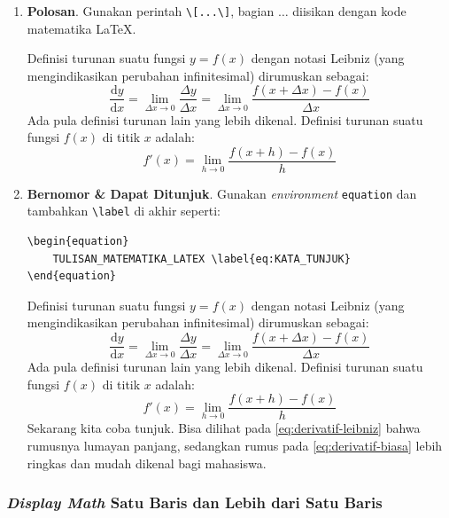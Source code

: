 \begin{enumerate}[label=\alph*.]
    \item \textbf{Polosan}. Gunakan perintah \verb|\[...\]|, bagian $\dots$ diisikan dengan kode matematika \LaTeX.
    
    Definisi turunan suatu fungsi $y = f(x)$ dengan notasi Leibniz (yang mengindikasikan perubahan infinitesimal) dirumuskan sebagai:
    \[\frac{\mathrm{d}y}{\mathrm{d}x} = \lim_{\Delta x \to 0} \frac{\Delta y}{\Delta x} = \lim_{\Delta x \to 0} \frac{f(x + \Delta x) - f(x)}{\Delta x}\]
    Ada pula definisi turunan lain yang lebih dikenal. Definisi turunan suatu fungsi $f(x)$ di titik $x$ adalah:
    \[f'(x) = \lim_{h \to 0} \frac{f(x+h) - f(x)}{h}\]
    
    \item \textbf{Bernomor \& Dapat Ditunjuk}. Gunakan \textit{environment} \texttt{equation} dan tambahkan \verb|\label| di akhir seperti:
    
    \begin{lstlisting}
\begin{equation}
    TULISAN_MATEMATIKA_LATEX \label{eq:KATA_TUNJUK}
\end{equation}    
    \end{lstlisting}
    
    Definisi turunan suatu fungsi $y = f(x)$ dengan notasi Leibniz (yang mengindikasikan perubahan infinitesimal) dirumuskan sebagai:
    \begin{equation}
        \frac{\mathrm{d}y}{\mathrm{d}x} = \lim_{\Delta x \to 0} \frac{\Delta y}{\Delta x} = \lim_{\Delta x \to 0} \frac{f(x + \Delta x) - f(x)}{\Delta x} \label{eq:derivatif-leibniz}
    \end{equation}
    Ada pula definisi turunan lain yang lebih dikenal. Definisi turunan suatu fungsi $f(x)$ di titik $x$ adalah:
    \begin{equation}
        f'(x) = \lim_{h \to 0} \frac{f(x+h) - f(x)}{h} \label{eq:derivatif-biasa}
    \end{equation}
    Sekarang kita coba tunjuk. Bisa dilihat pada \autoref{eq:derivatif-leibniz} bahwa rumusnya lumayan panjang, sedangkan rumus pada \autoref{eq:derivatif-biasa} lebih ringkas dan mudah dikenal bagi mahasiswa.
\end{enumerate}

\subsubsection{\textit{Display Math} Satu Baris dan Lebih dari Satu Baris}

